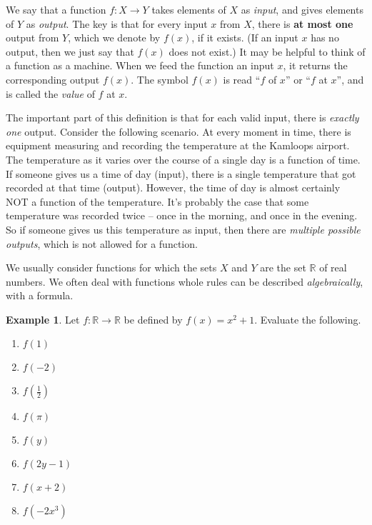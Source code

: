 \documentclass[letterpaper,12pt,oneside]{book}
\theoremstyle{definition}
\newtheorem{example}[theorem]{Example}
\begin{document}
{We say that a function $f:X\rightarrow Y$ takes elements of $X$ as \emph{input}, and gives elements of $Y$ as \emph{output}.  The key is that for every input $x$ from $X$, there is \textbf{at most one} output from $Y$, which we denote by $f(x)$, if it exists.  (If an input $x$ has no output, then we just say that $f(x)$ does not exist.)  It may be helpful to think of a function as a machine.  When we feed the function an input $x$, it returns the corresponding output $f(x)$.  The symbol $f(x)$ is read ``$f$ of $x$'' or ``$f$ at $x$'', and is called the \emph{value} of $f$ at $x$.

\vfill

The important part of this definition is that for each valid input, there is \emph{exactly one} output.  Consider the following scenario.  At every moment in time, there is equipment measuring and recording the temperature at the Kamloops airport.  The temperature as it varies over the course of a single day is a function of time.  If someone gives us a time of day (input), there is a single temperature that got recorded at that time (output).  However, the time of day is almost certainly NOT a function of the temperature.  It's probably the case that some temperature was recorded twice -- once in the morning, and once in the evening.  So if someone gives us this temperature as input, then there are \emph{multiple possible outputs}, which is not allowed for a function.

We usually consider functions for which the sets $X$ and $Y$ are the set $\mathbb{R}$ of real numbers.  We often deal with functions whole rules can be described \emph{algebraically}, with a formula.

\begin{example}
Let $f:\mathbb{R}\rightarrow\mathbb{R}$ be defined by $f(x)=x^2+1$.  Evaluate the following.
\begin{multicols}{2}
\begin{enumerate}
\item $f(1)$
\vspace{1cm}
\item $f(-2)$
\vspace{1cm}
\item $f(\frac{1}{2})$
\vspace{1cm}
\item $f(\pi)$
\vspace{0.5cm}
\item $f(y)$
\vspace{1cm}
\item $f(2y-1)$
\vspace{1cm}
\item $f(x+2)$
\vspace{1cm}
\item $f(-2x^3)$
\vspace{0.5cm}
\vspace*{\fill}
\end{enumerate}
\end{multicols}
\end{example}

}
\end{document}
